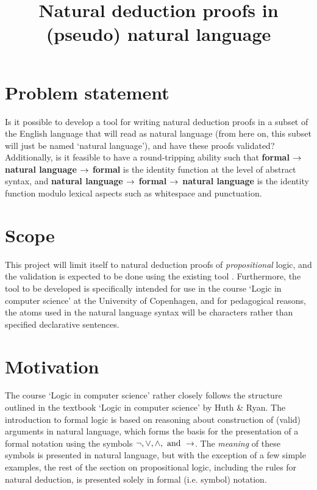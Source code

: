 \documentclass[a4paper]{article}
\title{Natural deduction proofs in (pseudo) natural language}
\begin{document}
\maketitle
\section{Problem statement}
    Is it possible to develop a tool for writing natural deduction proofs
    in a subset of the English language that will read as natural language
    (from here on, this subset will just be named `natural language'),
    and have these proofs validated? Additionally, is it feasible to have
    a round-tripping ability such that {\bf formal $\rightarrow$ natural language
    $\rightarrow$ formal} is the identity function at the level of abstract syntax,
    and {\bf natural language $\rightarrow$ formal $\rightarrow$ natural language} is the
    identity function modulo lexical aspects such as whitespace and
    punctuation.

\section{Scope}
    This project will limit itself to natural deduction proofs of
    \emph{propositional} logic, and the validation is expected to be done
    using the existing tool \cite{box}. Furthermore, the tool
    to be developed is specifically intended for use in the course `Logic
    in computer science' at the University of Copenhagen, and for  
    pedagogical reasons, the atoms used in the natural language syntax
    will be characters rather than specified declarative sentences.

\section{Motivation}
    The course `Logic in computer science' rather closely follows the 
    structure outlined in the textbook `Logic in computer science' by
    Huth \& Ryan\cite{hr}. The introduction to formal logic is based on
    reasoning about construction of (valid) arguments in natural 
    language\cite[pp.~1-2]{hr}, which forms the basis for the presentation
    of a formal notation using the symbols 
    \(\neg, \lor, \land, \textnormal{ and } \rightarrow\)\cite[p.~4]{hr}. 
    The \emph{meaning} of these symbols is presented in natural language,
    but with the exception of a few simple examples, the rest of the section 
    on propositional logic, including the rules for natural deduction,
    is presented solely in formal (i.e. symbol) notation.
\end{document}
